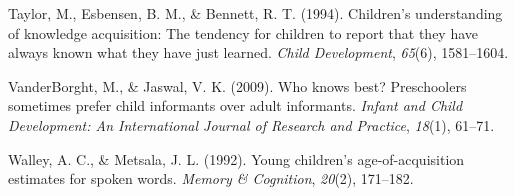 \documentclass[10pt, letterpaper]{article}
\begin{document}
\leavevmode\hypertarget{ref-taylor1994}{}%
Taylor, M., Esbensen, B. M., \& Bennett, R. T. (1994). Children's
understanding of knowledge acquisition: The tendency for children to
report that they have always known what they have just learned.
\emph{Child Development}, \emph{65}(6), 1581--1604.

\leavevmode\hypertarget{ref-vanderborght2009}{}%
VanderBorght, M., \& Jaswal, V. K. (2009). Who knows best? Preschoolers
sometimes prefer child informants over adult informants. \emph{Infant
and Child Development: An International Journal of Research and
Practice}, \emph{18}(1), 61--71.

\leavevmode\hypertarget{ref-walley1992}{}%
Walley, A. C., \& Metsala, J. L. (1992). Young children's
age-of-acquisition estimates for spoken words. \emph{Memory \&
Cognition}, \emph{20}(2), 171--182.


\end{document}
